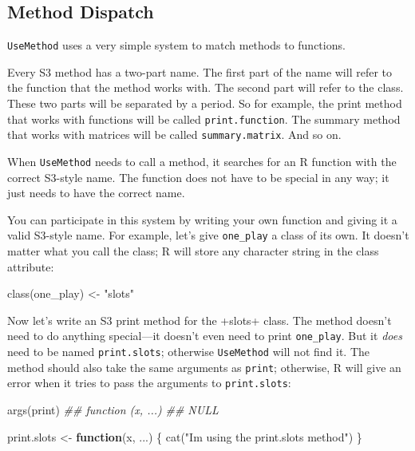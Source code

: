 \documentclass[
  letterpaper,
  DIV=11,
  numbers=noendperiod]{scrbook}
\newenvironment{Shaded}{\begin{snugshade}}{\end{snugshade}}
\newcommand{\ControlFlowTok}[1]{\textcolor[rgb]{0.00,0.23,0.31}{\textbf{#1}}}
\newcommand{\DocumentationTok}[1]{\textcolor[rgb]{0.37,0.37,0.37}{\textit{#1}}}
\newcommand{\FunctionTok}[1]{\textcolor[rgb]{0.28,0.35,0.67}{#1}}
\newcommand{\NormalTok}[1]{\textcolor[rgb]{0.00,0.23,0.31}{#1}}
\newcommand{\OtherTok}[1]{\textcolor[rgb]{0.00,0.23,0.31}{#1}}
\newcommand{\StringTok}[1]{\textcolor[rgb]{0.13,0.47,0.30}{#1}}
\begin{document}
\subsection{Method Dispatch}\label{method-dispatch}

\texttt{UseMethod} uses a very simple system to match methods to
functions.

Every S3 method has a two-part name. The first part of the name will
refer to the function that the method works with. The second part will
refer to the class. These two parts will be separated by a period. So
for example, the print method that works with functions will be called
\texttt{print.function}. The summary method that works with matrices
will be called \texttt{summary.matrix}. And so on.

When \texttt{UseMethod} needs to call a method, it searches for an R
function with the correct S3-style name. The function does not have to
be special in any way; it just needs to have the correct name.

You can participate in this system by writing your own function and
giving it a valid S3-style name. For example, let's give
\texttt{one\_play} a class of its own. It doesn't matter what you call
the class; R will store any character string in the class attribute:

\begin{Shaded}
\begin{Highlighting}[]
\FunctionTok{class}\NormalTok{(one\_play) }\OtherTok{\textless{}{-}} \StringTok{"slots"}
\end{Highlighting}
\end{Shaded}

Now let's write an S3 print method for the +slots+ class. The method
doesn't need to do anything special---it doesn't even need to print
\texttt{one\_play}. But it \emph{does} need to be named
\texttt{print.slots}; otherwise \texttt{UseMethod} will not find it. The
method should also take the same arguments as \texttt{print}; otherwise,
R will give an error when it tries to pass the arguments to
\texttt{print.slots}:

\begin{Shaded}
\begin{Highlighting}[]
\FunctionTok{args}\NormalTok{(print)}
\DocumentationTok{\#\# function (x, ...) }
\DocumentationTok{\#\# NULL}

\NormalTok{print.slots }\OtherTok{\textless{}{-}} \ControlFlowTok{function}\NormalTok{(x, ...) \{}
  \FunctionTok{cat}\NormalTok{(}\StringTok{"I\textquotesingle{}m using the print.slots method"}\NormalTok{)}
\NormalTok{\}}
\end{Highlighting}
\end{Shaded}
\end{document}
